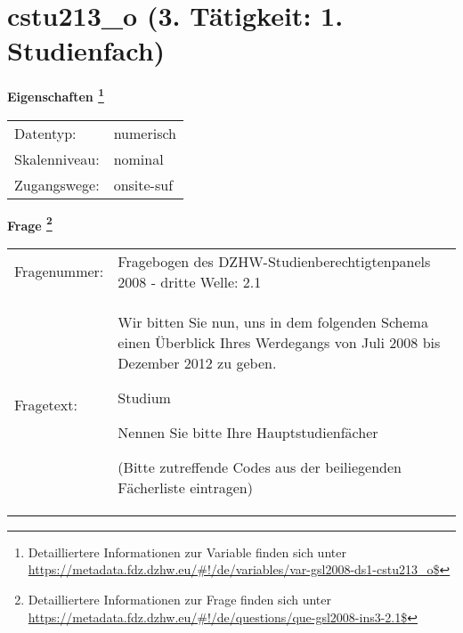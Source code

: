 
    \setcounter{footnote}{0}

    \vspace*{-1.8cm}
	\section{cstu213\_o (3. Tätigkeit: 1. Studienfach)}
	\label{section:cstu213_o}



    \vspace*{0.5cm}
    \noindent\textbf{Eigenschaften
	\footnote{Detailliertere Informationen zur Variable finden sich unter
		\url{https://metadata.fdz.dzhw.eu/\#!/de/variables/var-gsl2008-ds1-cstu213_o$}}}\\
	\begin{tabularx}{\hsize}{@{}lX}
	Datentyp: & numerisch \\
	Skalenniveau: & nominal \\
	Zugangswege: &
	  onsite-suf
 \\
    \end{tabularx}



				\vspace*{0.5cm}
                \noindent\textbf{Frage
	                \footnote{Detailliertere Informationen zur Frage finden sich unter
		              \url{https://metadata.fdz.dzhw.eu/\#!/de/questions/que-gsl2008-ins3-2.1$}}}\\
				\begin{tabularx}{\hsize}{@{}lX}
					Fragenummer: &
					  Fragebogen des DZHW-Studienberechtigtenpanels 2008 - dritte Welle:
					  2.1
 \\
					Fragetext: & Wir bitten Sie nun, uns in dem folgenden Schema einen Überblick Ihres Werdegangs von Juli 2008 bis Dezember 2012 zu geben.\par  Studium\par  Nennen Sie bitte Ihre Hauptstudienfächer\par  (Bitte zutreffende Codes aus der beiliegenden Fächerliste eintragen) \\
				\end{tabularx}





